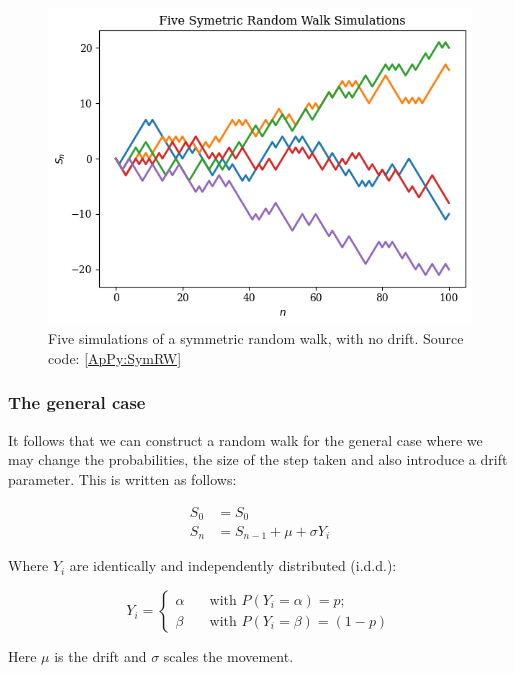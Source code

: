 \begin{figure}[H]
    \centering
    \includegraphics[width=\sOneSize\textwidth]{Chapters/C1/plots/RW_Simulations.png}
    \caption{Five simulations of a symmetric random walk, with no drift. Source code: \autoref{ApPy:SymRW}}\label{C1fig:OptionVolume}
\end{figure}

\subsubsection{The general case}

It follows that we can construct a random walk for the general case where we may change the probabilities, the size of the step taken and also introduce a drift parameter. This is written as follows:

\begin{align*}
    S_0 &= S_0 \\
    S_n &= S_{n-1} + \mu + \sigma Y_i
\end{align*}

Where \(Y_i\) are identically and independently distributed (i.d.d.):

\begin{equation*}
    Y_i = 
    \begin{cases}
       \alpha& \quad \text{with } P(Y_i = \alpha) = p; \\
       \beta& \quad \text{with } P(Y_i = \beta) = (1-p)
    \end{cases}
\end{equation*}

Here \(\mu \) is the drift and \(\sigma \) scales the movement.

